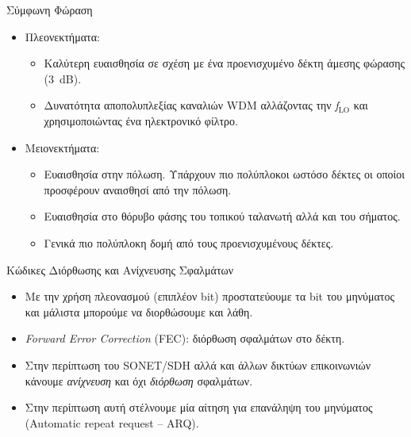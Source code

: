 \documentclass[11pt,aspectratio=169]{beamer}
\begin{document}
\begin{frame}[shrink=10,t]{Σύμφωνη Φώραση}
\begin{itemize}
\item Πλεονεκτήματα:
\begin{itemize}
\item Καλύτερη ευαισθησία σε σχέση με ένα προενισχυμένο δέκτη άμεσης φώρασης (3~dB).
\item Δυνατότητα αποπολυπλεξίας καναλιών WDM αλλάζοντας την \textit{f}$_{\text{LO}}$ και χρησιμοποιώντας ένα ηλεκτρονικό φίλτρο.
\end{itemize}
\item Μειονεκτήματα:
\begin{itemize}
\item Ευαισθησία στην πόλωση. Υπάρχουν πιο πολύπλοκοι ωστόσο δέκτες οι οποίοι προσφέρουν αναισθησί από την πόλωση.
\item Ευαισθησία στο θόρυβο φάσης του τοπικού ταλανωτή αλλά και του σήματος.
\item Γενικά πιο πολύπλοκη δομή από τους προενισχυμένους δέκτες.
\end{itemize}
\end{itemize}
\end{frame}

\begin{frame}[t]{Κώδικες Διόρθωσης και Ανίχνευσης Σφαλμάτων}
\begin{itemize}
\item Με την χρήση πλεονασμού (επιπλέον bit) προστατεύουμε τα bit του μηνύματος και μάλιστα μπορούμε να διορθώσουμε και λάθη.
\item \textit{Forward Error Correction} (FEC): διόρθωση σφαλμάτων στο δέκτη.
\item Στην περίπτωση του SONET/SDH αλλά και άλλων δικτύων επικοινωνιών κάνουμε \textit{ανίχνευση} και όχι \textit{διόρθωση} σφαλμάτων.
\item Στην περίπτωση αυτή στέλνουμε μία αίτηση για επανάληψη του μηνύματος (Automatic repeat request – ARQ).
\end{itemize}
\end{frame}
\end{document}
